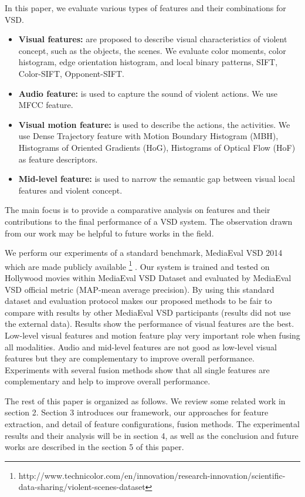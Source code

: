 \documentclass[review]{elsarticle}
\begin{document}
In this paper, we evaluate various types of features and their combinations for VSD. 
\begin{itemize}
	\item {\bf Visual features:} are proposed to describe visual characteristics of violent concept, such as the objects, the scenes. We evaluate color moments, color histogram, edge orientation histogram, and local binary patterns, SIFT, Color-SIFT, Opponent-SIFT.
	\item {\bf Audio feature:} is used  to capture the sound of violent actions. We use MFCC feature.
	\item {\bf Visual motion feature:} is used to describe the actions, the activities. We use Dense Trajectory feature with Motion Boundary Histogram (MBH), Histograms of Oriented Gradients (HoG),  Histograms of Optical Flow (HoF) as feature descriptors.
	\item {\bf Mid-level feature:} is used to narrow the semantic gap between visual local features and violent concept.
\end{itemize}
The main focus is to provide a comparative analysis on features and their contributions to the final performance of a VSD system. The observation drawn from our work may be helpful to future works in the field.

We perform our experiments of a standard benchmark, MediaEval VSD 2014\cite{demarty2014benchmarking} which are made publicly available \footnote{http://www.technicolor.com/en/innovation/research-innovation/scientific-data-sharing/violent-scenes-dataset} . Our system is trained and tested on Hollywood movies within MediaEval VSD Dataset and evaluated by MediaEval VSD official metric (MAP-mean average precision). By using this standard dataset and evaluation protocol makes our proposed methods to be fair to compare with results by other MediaEval VSD participants (results did not use the external data). Results show the performance of visual features are the best. Low-level visual features and motion feature play very important role when fusing all modalities. Audio and mid-level features are not good as low-level visual features but they are complementary to improve overall performance. Experiments with several fusion methods show that all single features are complementary and help to improve overall performance.

The rest of this paper is organized as follows. We review some related work in section 2. Section 3 introduces our framework, our approaches for feature extraction, and detail of feature configurations, fusion methods. The experimental results and their analysis will be in section 4, as well as the conclusion and future works are described in the section 5 of this paper.
\end{document}
